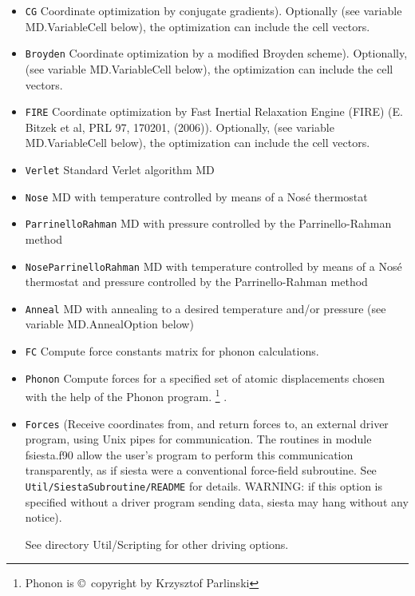 \documentclass[11pt]{article}
\begin{document}
\begin{itemize}

\item {\tt CG} Coordinate optimization by conjugate
  gradients). Optionally (see variable MD.VariableCell below), the
  optimization can include the cell vectors.

\item {\tt Broyden} Coordinate optimization by a modified Broyden
  scheme). Optionally, (see variable MD.VariableCell below), the
  optimization can include the cell vectors.

\item {\tt FIRE} Coordinate optimization by Fast Inertial Relaxation
  Engine (FIRE) (E. Bitzek et al, PRL 97, 170201, (2006)).
  Optionally, (see variable MD.VariableCell below), the
  optimization can include the cell vectors.

\item {\tt Verlet} Standard Verlet algorithm MD

\item {\tt Nose}  MD with temperature controlled  by means of a Nos\'e
thermostat

\item {\tt ParrinelloRahman}  MD with pressure controlled by
the Parrinello-Rahman method

\item {\tt NoseParrinelloRahman}  MD with temperature controlled
by means of a Nos\'e thermostat and pressure controlled by
the Parrinello-Rahman method

\item {\tt Anneal}  MD with annealing to a desired
temperature and/or pressure (see variable MD.AnnealOption below)

\item {\tt FC} Compute force constants matrix for phonon calculations.

\item {\tt Phonon} Compute forces for a specified set of atomic
  displacements chosen with the help of the {\sc Phonon}
  program. \footnote{{\sc Phonon} is \copyright\ copyright by
    Krzysztof Parlinski}  .

\item {\tt Forces} (Receive coordinates from, and return forces to, an
  external driver program, using Unix pipes for communication.  The
  routines in module fsiesta.f90 allow the user's program to perform
  this communication transparently, as if siesta were a conventional
  force-field subroutine. See {\tt Util/SiestaSubroutine/README} for
  details. WARNING: if this option is specified without a driver
  program sending data, siesta may hang without any notice).

See directory Util/Scripting  for other driving options.

\end{itemize}
\end{document}
